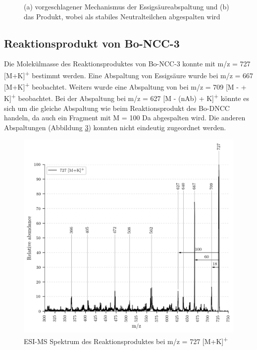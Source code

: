 \begin{figure}[!htbp]
\begin{subfigure}[b]{0.5\textwidth}
    \caption{}
    \label{fig:699MK639}
  \end{subfigure}
  \caption[Vorschlag des Mechanismus der  Abspaltung, Quelle: Autor]{(a) vorgeschlagener Mechanismus der Essigsäureabspaltung und (b) das Produkt, wobei  als stabiles Neutralteilchen abgespalten wird}
\end{figure}



\pagebreak
\subsection{Reaktionsprodukt von Bo-NCC-3}

Die Molekülmasse des Reaktionsproduktes von Bo-NCC-3 konnte mit m/z = 727 [M+K]\textsuperscript{+} bestimmt werden. Eine Abspaltung von Essigsäure wurde bei m/z = 667 [M+K]\textsuperscript{+} beobachtet. Weiters wurde eine Abspaltung von  bei m/z = 709 [M -  + K]\textsuperscript{+} beobachtet. Bei der Abspaltung bei m/z = 627 [M - (\gls{nAb}) + K]\textsuperscript{+} könnte es sich um die gleiche Abspaltung wie beim Reaktionsprodukt des Bo-DNCC handeln, da auch ein Fragment mit M = 100 Da abgespalten wird. Die anderen Abspaltungen (Abbildung \ref{fig:727MKLeafspray}) konnten nicht eindeutig zugeordnet werden.

\begin{figure}[!htbp]
  \centering
  \includegraphics[width=\textwidth, height=0.7\textwidth]{figures/Kapitel4/Kataboliten/VWA_MS_LeafSpray_727.png}
  \caption[ESI-MS des Reaktionsproduktes von Bo-NCC-3, Quelle: Autor]{ESI-MS Spektrum des Reaktionsproduktes bei m/z = 727 [M+K]\textsuperscript{+}}
  \label{fig:727MKLeafspray}
\end{figure}

